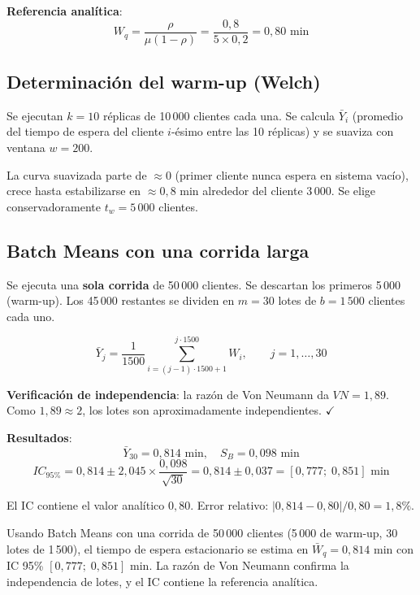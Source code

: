 \documentclass[11pt, letterpaper]{article}
\begin{document}
\textbf{Referencia analítica}:
\[
W_q = \frac{\rho}{\mu(1-\rho)} = \frac{0{,}8}{5 \times 0{,}2} = 0{,}80 \text{ min}
\]

\subsection{Determinación del warm-up (Welch)}

Se ejecutan $k=10$ réplicas de 10\,000 clientes cada una. Se calcula $\bar Y_i$ (promedio del tiempo de espera del cliente $i$-ésimo entre las 10 réplicas) y se suaviza con ventana $w=200$.

La curva suavizada parte de $\approx 0$ (primer cliente nunca espera en sistema vacío), crece hasta estabilizarse en $\approx 0{,}8$ min alrededor del cliente 3\,000. Se elige conservadoramente $t_w = 5\,000$ clientes.

\subsection{Batch Means con una corrida larga}

Se ejecuta una \textbf{sola corrida} de 50\,000 clientes. Se descartan los primeros 5\,000 (warm-up). Los 45\,000 restantes se dividen en $m=30$ lotes de $b=1\,500$ clientes cada uno.

\[
\bar Y_j = \frac{1}{1500}\sum_{i=(j-1)\cdot 1500+1}^{j\cdot 1500} W_i, \qquad j=1,\ldots,30
\]

\textbf{Verificación de independencia}: la razón de Von Neumann da $VN = 1{,}89$. Como $1{,}89 \approx 2$, los lotes son aproximadamente independientes. $\checkmark$

\textbf{Resultados}:
\[
\bar Y_{30} = 0{,}814 \text{ min}, \quad S_B = 0{,}098 \text{ min}
\]
\[
IC_{95\%} = 0{,}814 \pm 2{,}045 \times \frac{0{,}098}{\sqrt{30}} = 0{,}814 \pm 0{,}037 = [0{,}777;\; 0{,}851] \text{ min}
\]

El IC contiene el valor analítico $0{,}80$. Error relativo: $|0{,}814 - 0{,}80|/0{,}80 = 1{,}8\%$.

\begin{resultadobox}
Usando Batch Means con una corrida de 50\,000 clientes (5\,000 de warm-up, 30 lotes de 1\,500), el tiempo de espera estacionario se estima en $\bar W_q = 0{,}814$ min con IC 95\% $[0{,}777;\; 0{,}851]$ min. La razón de Von Neumann confirma la independencia de lotes, y el IC contiene la referencia analítica.
\end{resultadobox}
\end{document}
